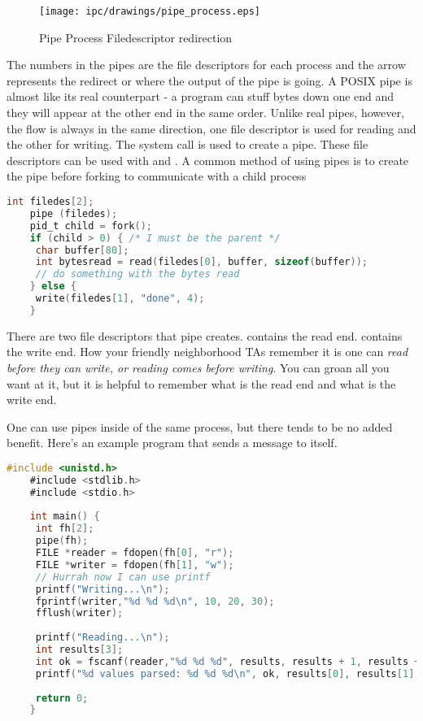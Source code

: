 	\begin{figure}[H]
	 \centering
	 \texttt{[image: ipc/drawings/pipe\_process.eps]}
	 \caption{Pipe Process Filedescriptor redirection}
	\end{figure}
	 
	The numbers in the pipes are the file descriptors for each process and the arrow represents the redirect or where the output of the pipe is going.
	A POSIX pipe is almost like its real counterpart - a program can stuff bytes down one end and they will appear at the other end in the same order.
	Unlike real pipes, however, the flow is always in the same direction, one file descriptor is used for reading and the other for writing.
	The  system call is used to create a pipe.
	These file descriptors can be used with  and .
	A common method of using pipes is to create the pipe before forking to communicate with a child process
	 
	\begin{lstlisting}[language=C]
	int filedes[2];
	pipe (filedes);
	pid_t child = fork();
	if (child > 0) { /* I must be the parent */
	 char buffer[80];
	 int bytesread = read(filedes[0], buffer, sizeof(buffer));
	 // do something with the bytes read
	} else {
	 write(filedes[1], "done", 4);
	}
	\end{lstlisting}
	 
	There are two file descriptors that pipe creates.
	 contains the read end.
	 contains the write end.
	How your friendly neighborhood TAs remember it is one can \textit{read before they can write, or reading comes before writing}.
	You can groan all you want at it, but it is helpful to remember what is the read end and what is the write end.
	 
	One can use pipes inside of the same process, but there tends to be no added benefit.
	Here's an example program that sends a message to itself.
	 
	\begin{lstlisting}[language=C]
	#include <unistd.h>
	#include <stdlib.h>
	#include <stdio.h>
	 
	int main() {
	 int fh[2];
	 pipe(fh);
	 FILE *reader = fdopen(fh[0], "r");
	 FILE *writer = fdopen(fh[1], "w");
	 // Hurrah now I can use printf
	 printf("Writing...\n");
	 fprintf(writer,"%d %d %d\n", 10, 20, 30);
	 fflush(writer);
	 
	 printf("Reading...\n");
	 int results[3];
	 int ok = fscanf(reader,"%d %d %d", results, results + 1, results + 2);
	 printf("%d values parsed: %d %d %d\n", ok, results[0], results[1], results[2]);
	 
	 return 0;
	}
	\end{lstlisting}
	 
